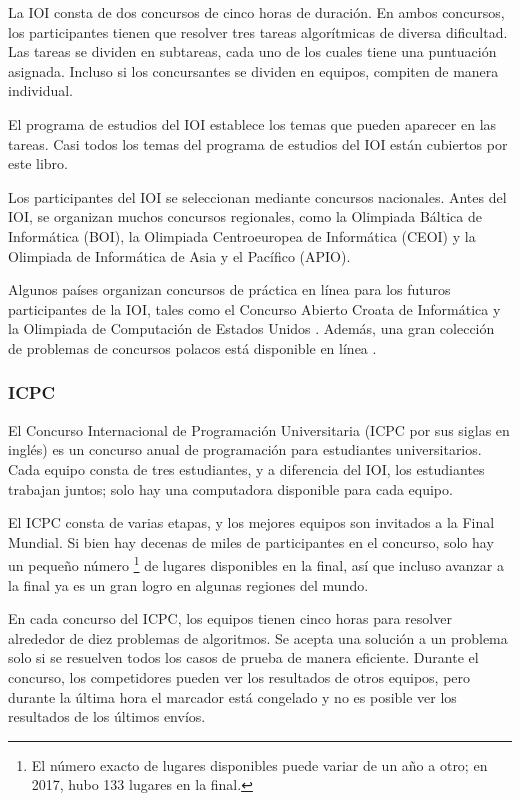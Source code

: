 La IOI consta de dos concursos de cinco horas de duración.
En ambos concursos, los participantes tienen que
resolver tres tareas algorítmicas de diversa dificultad.
Las tareas se dividen en subtareas,
cada uno de los cuales tiene una puntuación asignada.
Incluso si los concursantes se dividen en equipos,
compiten de manera individual.

El programa de estudios del IOI \cite{iois} establece los temas
que pueden aparecer en las tareas.
Casi todos los temas del programa de estudios del IOI
están cubiertos por este libro.

Los participantes del IOI se seleccionan mediante
concursos nacionales.
Antes del IOI, se organizan muchos concursos regionales,
como la Olimpiada Báltica de Informática (BOI),
la Olimpiada Centroeuropea de Informática (CEOI)
y la Olimpiada de Informática de Asia y el Pacífico (APIO).

Algunos países organizan concursos de práctica en línea
para los futuros participantes de la IOI,
tales como el Concurso Abierto Croata de Informática \cite{coci}
y la Olimpiada de Computación de Estados Unidos \cite{usaco}.
Además, una gran colección de problemas de concursos polacos
está disponible en línea \cite{main}.

\subsubsection{ICPC}

El Concurso Internacional de Programación Universitaria (ICPC por sus siglas en inglés)
es un concurso anual de programación para estudiantes universitarios.
Cada equipo consta de tres estudiantes,
y a diferencia del IOI, los estudiantes trabajan juntos;
solo hay una computadora disponible para cada equipo.


El ICPC consta de varias etapas, y
los mejores equipos son invitados a la Final Mundial.
Si bien hay decenas de miles de participantes
en el concurso, solo hay un pequeño número \footnote{El número exacto de lugares
disponibles puede variar de un año a otro; en 2017, hubo 133 lugares en la final.} de lugares disponibles en la final,
así que incluso avanzar a la final
ya es un gran logro en algunas regiones del mundo.

En cada concurso del ICPC, los equipos tienen cinco horas para
resolver alrededor de diez problemas de algoritmos.
Se acepta una solución a un problema solo si se resuelven
todos los casos de prueba de manera eficiente.
Durante el concurso, los competidores pueden ver los resultados de otros equipos,
pero durante la última hora el marcador está congelado y
no es posible ver los resultados de los últimos envíos.

